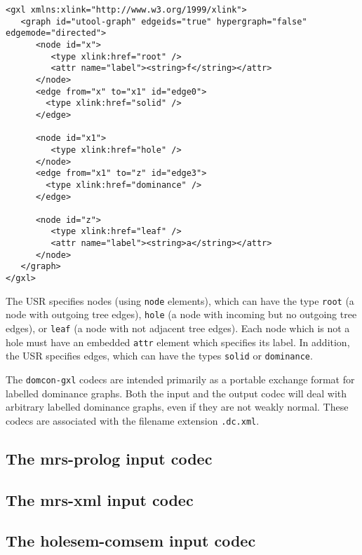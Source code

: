 \begin{verbatim}
<gxl xmlns:xlink="http://www.w3.org/1999/xlink">
   <graph id="utool-graph" edgeids="true" hypergraph="false" edgemode="directed">
      <node id="x">
         <type xlink:href="root" />
         <attr name="label"><string>f</string></attr>
      </node>
      <edge from="x" to="x1" id="edge0">
        <type xlink:href="solid" />
      </edge>

      <node id="x1">
         <type xlink:href="hole" />
      </node>
      <edge from="x1" to="z" id="edge3">
        <type xlink:href="dominance" />
      </edge>

      <node id="z">
         <type xlink:href="leaf" />
         <attr name="label"><string>a</string></attr>
      </node>
   </graph>
</gxl>
\end{verbatim}

The USR specifies nodes (using \verb?node? elements), which can have
the type \verb?root? (a node with outgoing tree edges), \verb?hole? (a
node with incoming but no outgoing tree edges), or \verb?leaf? (a node
with not adjacent tree edges). Each node which is not a hole must have
an embedded \verb?attr? element which specifies its label. In
addition, the USR specifies edges, which can have the types
\verb?solid? or \verb?dominance?.

The \verb?domcon-gxl? codecs are intended primarily as a portable
exchange format for labelled dominance graphs. Both the input and the
output codec will deal with arbitrary labelled dominance graphs, even
if they are not weakly normal. These codecs are associated with the
filename extension \verb?.dc.xml?.



\subsection{The mrs-prolog input codec}

\cite{mrs-dom}


\subsection{The mrs-xml input codec}




\subsection{The holesem-comsem input codec}

